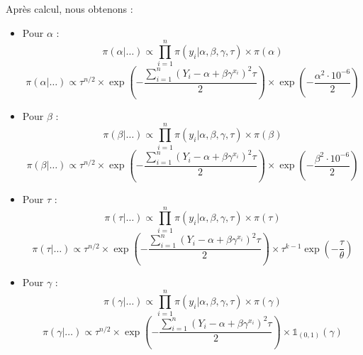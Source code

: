 \documentclass{rapportECN}
\begin{document}
Après calcul, nous obtenons :

\begin{itemize}

\item Pour $\alpha$ :\\
$$\pi(\alpha | \dots) \propto \prod_{i=1}^{n} \pi (y_i | \alpha, \beta, \gamma, \tau) \times \pi(\alpha)$$
$$\pi(\alpha | \dots) \propto \tau^{n/2} \times \exp \left( -\frac{\sum_{i=1}^{n} (Y_i - \alpha + \beta \gamma^{x_i})^2 \tau}{2 } \right) \times \exp \left( -\frac{\alpha^2 \cdot 10^{-6}}{2 } \right)$$

\item Pour $\beta$ : \\
$$\pi(\beta | \dots) \propto \prod_{i=1}^{n} \pi (y_i | \alpha, \beta, \gamma, \tau) \times \pi(\beta)$$
$$\pi(\beta | \dots) \propto \tau^{n/2} \times \exp \left( -\frac{\sum_{i=1}^{n} (Y_i - \alpha + \beta \gamma^{x_i})^2 \tau}{2 } \right) \times \exp \left( -\frac{\beta^2 \cdot 10^{-6}}{2 } \right)$$

\item Pour $\tau$ : \\
$$\pi(\tau | \dots) \propto \prod_{i=1}^{n} \pi (y_i | \alpha, \beta, \gamma, \tau) \times \pi(\tau)$$
$$\pi(\tau | \dots) \propto \tau^{n/2} \times \exp \left( -\frac{\sum_{i=1}^{n} (Y_i - \alpha + \beta \gamma^{x_i})^2 \tau}{2 } \right) \times \tau^{k-1} \exp(-\frac{\tau}{\theta})$$

\item Pour $\gamma$ : \\

$$\pi(\gamma | \dots) \propto \prod_{i=1}^{n} \pi (y_i | \alpha, \beta, \gamma, \tau) \times \pi(\gamma)$$
$$\pi(\gamma | \dots) \propto \tau^{n/2} \times \exp \left( -\frac{\sum_{i=1}^{n} (Y_i - \alpha + \beta \gamma^{x_i})^2 \tau}{2 } \right) \times \mathbb{1}_{(0,1)}(\gamma)$$



\end{itemize}

\hspace{5}
\end{document}

